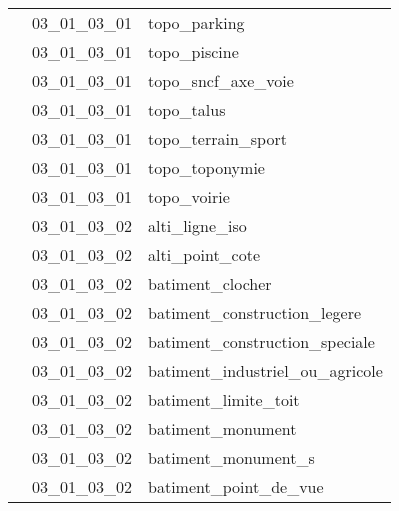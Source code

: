 \documentclass[12pt,titlepage,oneside]{book}
\begin{document}
\begin{supertabular}{|p{10cm}|c|p{15cm}|}
                    & 03\_01\_03\_01 & topo\_parking\\


                    & 03\_01\_03\_01 & topo\_piscine\\


                    & 03\_01\_03\_01 & topo\_sncf\_axe\_voie\\


                    & 03\_01\_03\_01 & topo\_talus\\


                    & 03\_01\_03\_01 & topo\_terrain\_sport\\


                    & 03\_01\_03\_01 & topo\_toponymie\\


                    & 03\_01\_03\_01 & topo\_voirie\\


                    & 03\_01\_03\_02 & alti\_ligne\_iso\\


                    & 03\_01\_03\_02 & alti\_point\_cote\\


                    & 03\_01\_03\_02 & batiment\_clocher\\


                    & 03\_01\_03\_02 & batiment\_construction\_legere\\


                    & 03\_01\_03\_02 & batiment\_construction\_speciale\\


                    & 03\_01\_03\_02 & batiment\_industriel\_ou\_agricole\\


                    & 03\_01\_03\_02 & batiment\_limite\_toit\\


                    & 03\_01\_03\_02 & batiment\_monument\\


                    & 03\_01\_03\_02 & batiment\_monument\_s\\


                    & 03\_01\_03\_02 & batiment\_point\_de\_vue\\



\end{supertabular}
\end{document}

